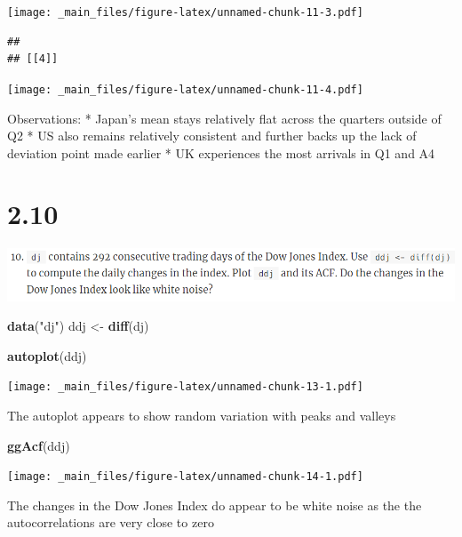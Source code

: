 \documentclass[]{book}
\newenvironment{Shaded}{\begin{snugshade}}{\end{snugshade}}
\newcommand{\KeywordTok}[1]{\textcolor[rgb]{0.13,0.29,0.53}{\textbf{#1}}}
\newcommand{\NormalTok}[1]{#1}
\newcommand{\StringTok}[1]{\textcolor[rgb]{0.31,0.60,0.02}{#1}}
\begin{document}
\texttt{[image: \_main\_files/figure-latex/unnamed-chunk-11-3.pdf]}

\begin{verbatim}
## 
## [[4]]
\end{verbatim}

\texttt{[image: \_main\_files/figure-latex/unnamed-chunk-11-4.pdf]}

Observations:
* Japan's mean stays relatively flat across the quarters outside of Q2
* US also remains relatively consistent and further backs up the lack of deviation point made earlier
* UK experiences the most arrivals in Q1 and A4

\hypertarget{section-2}{%
\section{2.10}\label{section-2}}

\includegraphics{./week1/2.10.png}

\begin{Shaded}
\begin{Highlighting}[]
\KeywordTok{data}\NormalTok{(}\StringTok{"dj"}\NormalTok{)}
\NormalTok{ddj <-}\StringTok{ }\KeywordTok{diff}\NormalTok{(dj)}
\end{Highlighting}
\end{Shaded}

\begin{Shaded}
\begin{Highlighting}[]
\KeywordTok{autoplot}\NormalTok{(ddj)}
\end{Highlighting}
\end{Shaded}

\texttt{[image: \_main\_files/figure-latex/unnamed-chunk-13-1.pdf]}

The autoplot appears to show random variation with peaks and valleys

\begin{Shaded}
\begin{Highlighting}[]
\KeywordTok{ggAcf}\NormalTok{(ddj)}
\end{Highlighting}
\end{Shaded}

\texttt{[image: \_main\_files/figure-latex/unnamed-chunk-14-1.pdf]}

The changes in the Dow Jones Index do appear to be white noise as the the autocorrelations are very close to zero
\end{document}
